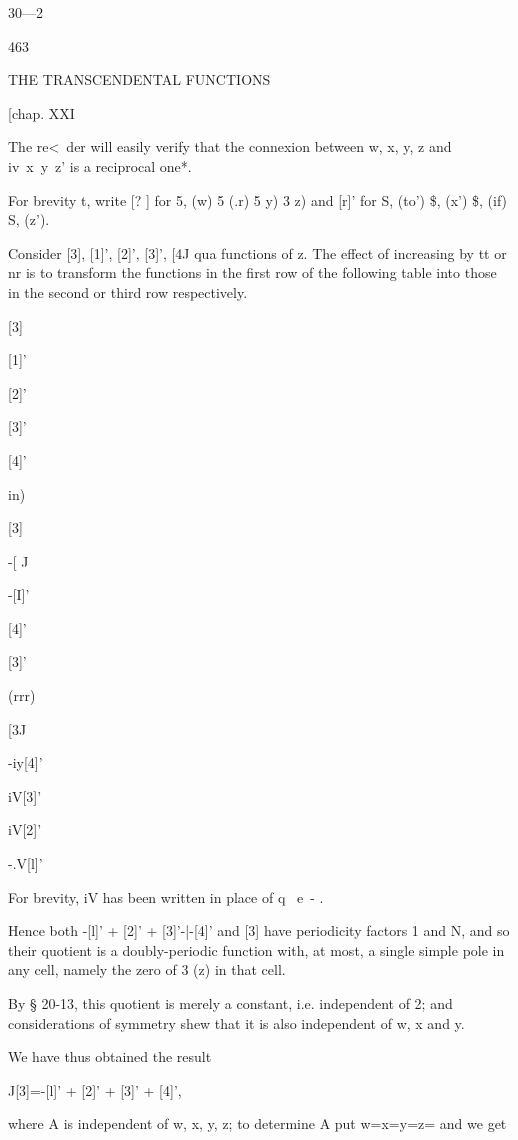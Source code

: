 30—2



463



THE TRANSCENDENTAL FUNCTIONS



[chap. XXI



The re<\ der will easily verify that the connexion between w, x, y, z
and iv\ x\ y\ z' is a reciprocal one*.

For brevity t, write [? ] for 5, (w) 5 (.r) 5 y) 3 z) and [r]' for S,
(to') \$, (x') \$, (if) S, (z').

Consider [3], [1]', [2]', [3]', [4J qua functions of z. The effect of
increasing by tt or nr is to transform the functions in the first row
of the following table into those in the second or third row
respectively.





[3]


[1]'


[2]'


[3]'


[4]'


in)


[3]


-[ J


-[I]'


[4]'


[3]'


(rrr)


 [3J


-iy[4]'


iV[3]'


iV[2]'


-.V[l]'



For brevity, iV has been written in place of q~ e~- .

Hence both -[l]' + [2]' + [3]'-|-[4]' and [3] have periodicity factors
1 and N, and so their quotient is a doubly-periodic function with, at
most, a single simple pole in any cell, namely the zero of 3 (z) in
that cell.

By § 20-13, this quotient is merely a constant, i.e. independent of 2;
and considerations of symmetry shew that it is also independent of w,
x and y.

We have thus obtained the result

J[3]=-[l]' + [2]' + [3]' + [4]',

where A is independent of w, x, y, z; to determine A put w=x=y=z= and
we get

